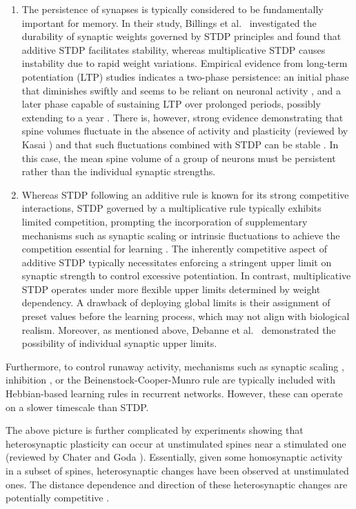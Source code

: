 \documentclass[utf8]{FrontiersinHarvard} %
\begin{document}
\begin{enumerate}
    \item The persistence of synapses is typically considered to be fundamentally important for memory. In their study, Billings et al.~\citeyearpar{Billings.2009} investigated the durability of synaptic weights governed by STDP principles and found that additive STDP facilitates stability, whereas multiplicative STDP causes instability due to rapid weight variations. Empirical evidence from long-term potentiation (LTP) studies indicates a two-phase persistence: an initial phase that diminishes swiftly and seems to be reliant on neuronal activity \citep{Dong.2015}, and a later phase capable of sustaining LTP over prolonged periods, possibly extending to a year \citep{Abraham.2002}. There is, however, strong evidence demonstrating that spine volumes fluctuate in the absence of activity and plasticity (reviewed by Kasai \citeyearpar{KASAI.20239m}) and that such fluctuations combined with STDP can be stable \citep{Humble.2019}. In this case, the mean spine volume of a group of neurons must be persistent rather than the individual synaptic strengths.

    \item Whereas STDP following an additive rule is known for its strong competitive interactions, STDP governed by a multiplicative rule typically exhibits limited competition, prompting the incorporation of supplementary mechanisms such as synaptic scaling or intrinsic fluctuations to achieve the competition essential for learning \citep{Rossum.2000jye,Humble.2019}. The inherently competitive aspect of additive STDP typically necessitates enforcing a stringent upper limit on synaptic strength to control excessive potentiation. In contrast, multiplicative STDP operates under more flexible upper limits determined by weight dependency. A drawback of deploying global limits is their assignment of preset values before the learning process, which may not align with biological realism. Moreover, as mentioned above, Debanne et al.~\citeyearpar{Debanne.1999} demonstrated the possibility of individual synaptic upper limits.
\end{enumerate}

Furthermore, to control runaway activity, mechanisms such as synaptic scaling \citep{Turrigiano.2008}, inhibition \citep{Bannon.2020,Eckmann.2024}, or the Beinenstock-Cooper-Munro rule \citep{Cooper.2012} are typically included with Hebbian-based learning rules in recurrent networks. However, these can operate on a slower timescale than STDP.

The above picture is further complicated by experiments showing that heterosynaptic plasticity can occur at unstimulated spines near a stimulated one (reviewed by Chater and Goda \citeyearpar{Chater.2021}). Essentially, given some homosynaptic activity in a subset of spines, heterosynaptic changes have been observed at unstimulated ones. The distance dependence and direction of these heterosynaptic changes are potentially competitive \citep{Chater.2024}.
\end{document}
